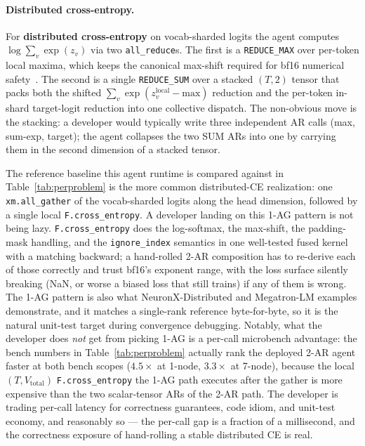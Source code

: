 \paragraph{Distributed cross-entropy.} For \textbf{distributed
cross-entropy} on vocab-sharded logits the agent computes
$\log\sum_v\exp(z_v)$ via two \texttt{all\_reduce}s. The first
is a \texttt{REDUCE\_MAX} over per-token local maxima, which
keeps the canonical max-shift required for bf16
numerical safety~\cite{kalamkar2019bf16, micikevicius2018mixed}.
The second is a single \texttt{REDUCE\_SUM} over a stacked
$(T, 2)$ tensor that packs both the shifted
$\sum_v\exp(z_v^{\text{local}} - \text{max})$ reduction and the
per-token in-shard target-logit reduction into one collective
dispatch. The non-obvious move is the stacking: a developer would
typically write three independent AR calls
(max, sum-exp, target); the agent collapses the two SUM ARs
into one by carrying them in the second dimension of a stacked
tensor.

The reference baseline this agent runtime is compared against in
Table~\ref{tab:perproblem} is the more common
distributed-CE realization: one \texttt{xm.all\_gather} of the
vocab-sharded logits along the head dimension, followed by a
single local \texttt{F.cross\_entropy}. A developer landing on
this 1-AG pattern is not being lazy. \texttt{F.cross\_entropy} does
the log-softmax, the max-shift, the padding-mask handling, and the
\texttt{ignore\_index} semantics in one
well-tested fused kernel with a matching backward;
a hand-rolled 2-AR composition has to re-derive each of those
correctly and trust bf16's exponent range, with the loss surface
silently breaking
(NaN, or worse a biased loss that still trains) if any of them is
wrong. The 1-AG pattern is also what NeuronX-Distributed and
Megatron-LM examples demonstrate, and it matches a single-rank
reference byte-for-byte, so it is the natural unit-test target
during convergence debugging. Notably, what the developer does \emph{not} get from picking 1-AG
is a per-call microbench advantage: the bench numbers in
Table~\ref{tab:perproblem} actually rank the deployed 2-AR agent
faster at both bench scopes ($4.5\times$ at 1-node, $3.3\times$
at 7-node), because the local $(T, V_\text{total})$
\texttt{F.cross\_entropy} the 1-AG path executes after the gather
is more expensive than the two scalar-tensor ARs of the 2-AR
path. The developer is trading per-call latency for correctness
guarantees, code idiom, and unit-test economy, and reasonably so
--- the per-call gap is a fraction of a millisecond, and the
correctness exposure of hand-rolling a stable distributed CE is
real.

